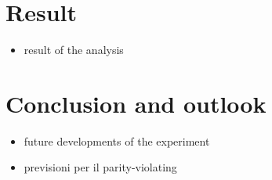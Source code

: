 \chapter{Result}

\begin{itemize}
\item result of the analysis
\end{itemize}

\chapter{Conclusion and outlook} \label{conclusion}

\begin{itemize}
\item future developments of the experiment
\item previsioni per il parity-violating
\end{itemize}